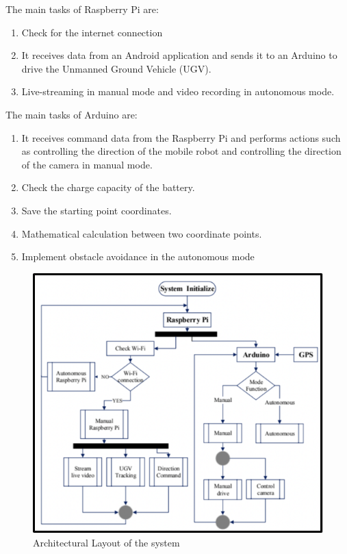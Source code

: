 \documentclass[conference,a4paper]{IEEEtran}
\begin{document}
The main tasks of Raspberry Pi are:
\begin{enumerate}
  \item Check for the internet connection
  \item It receives data from an Android application and sends it to an Arduino to drive the Unmanned Ground Vehicle (UGV).
  \item Live-streaming in  manual mode and video recording  in  autonomous mode.
\end{enumerate}

The main tasks of Arduino are: 
\begin{enumerate}
    \item It receives command data from the Raspberry Pi and performs actions such as controlling the direction of the mobile robot and controlling the direction of the camera  in manual mode.
    \item Check the  charge capacity of the battery.
    \item Save the starting point coordinates.
    \item Mathematical calculation between two coordinate points.
    \item Implement obstacle avoidance in the autonomous mode 
\end{enumerate}

\begin{figure}[ht]
\centering
\includegraphics[width=1\linewidth]{IoT3.jpg}
\caption{Architectural Layout of the system}
\label{Fig: IoT5}
\end{figure}
\end{document}

